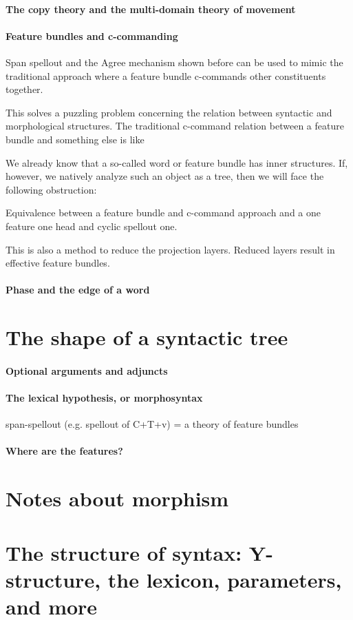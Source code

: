 \documentclass[a4paper]{article}
\begin{document}
\paragraph{The copy theory and the multi-domain theory of movement}

\paragraph{Feature bundles and c-commanding} Span spellout and the Agree mechanism shown before can be used to 
mimic the traditional approach where a feature bundle c-commands other constituents together. 

This solves a puzzling problem concerning the relation between syntactic and morphological structures. 
The traditional c-command relation between a feature bundle and something else is like
\begin{center}
    
\end{center}
We already know that a so-called word or feature bundle has inner structures. If, however, we natively analyze such an object as a tree, then we will face the following obstruction:
\begin{center}
    
\end{center}

\begin{exe}
    \ex Equivalence between a feature bundle and c-command approach and a one feature one head and cyclic spellout one.

        
\end{exe}

This is also a method to reduce the projection layers. Reduced layers result in effective feature bundles.

\paragraph{Phase and the edge of a word} 

\section{The shape of a syntactic tree}

\paragraph{Optional arguments and adjuncts} 

\paragraph{The lexical hypothesis, or morphosyntax} span-spellout (e.g. spellout of C+T+v) = a theory of feature bundles

\paragraph{Where are the features?} 

\section{Notes about morphism}

\section{The structure of syntax: Y-structure, the lexicon, parameters, and more}
\end{document}
